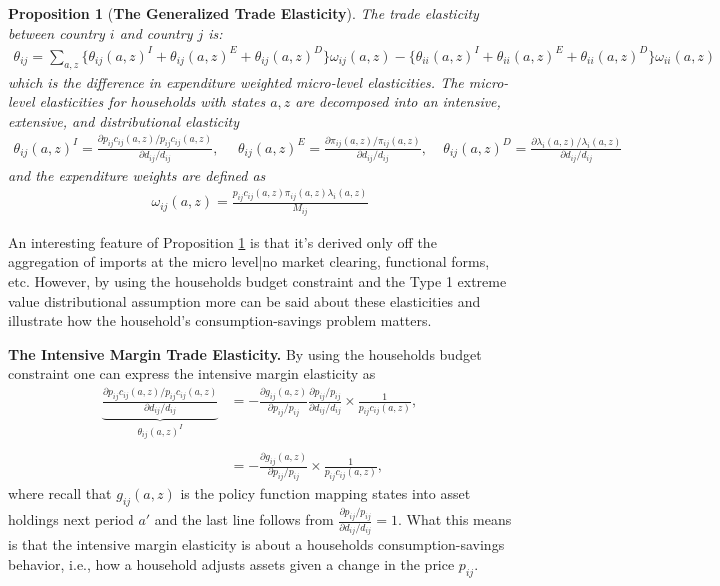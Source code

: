 \documentclass[12pt,pdftex]{article}
\newtheorem{prp}{Proposition}
\begin{document}
\begin{onehalfspacing}
\begin{prp}[\textbf{The Generalized Trade Elasticity}] \label{apx-prp:GET} The trade elasticity between country $i$ and country $j$ is:
{\footnotesize
\begin{align}
\theta_{ij} = \sum_{a,z} \bigg \{ \theta_{ij}(a,z)^{I} + \theta_{ij}(a,z)^{E} + \theta_{ij}(a,z)^{D} \bigg \}\omega_{ij}(a,z) - \bigg \{ \theta_{ii}(a,z)^{I} + \theta_{ii}(a,z)^{E} + \theta_{ii}(a,z)^{D} \bigg \}\omega_{ii}(a,z)
\label{eq:apx-trade-elasticity}
\end{align}
}which is the difference in expenditure weighted micro-level elasticities. The micro-level elasticities for households with states $a,z$ are decomposed into an intensive, extensive, and distributional elasticity
{\footnotesize
\begin{align}
\nonumber
\theta_{ij}(a,z)^{I} = \frac{\partial p_{ij}c_{ij}(a,z)/ p_{ij}c_{ij}(a,z)}{\partial d_{ij} / d_{ij}}, \ \ \ \ \ \ \theta_{ij}(a,z)^{E} = \frac{\partial \pi_{ij}(a,z) / \pi_{ij}(a,z)}{\partial d_{ij} / d_{ij}}, \ \ \ \ \
\theta_{ij}(a,z)^{D} = \frac{\partial \lambda_{i}(a,z) / \lambda_{i}(a,z)}{\partial d_{ij} / d_{ij}}
\end{align}
}
and the expenditure weights are defined as
{\footnotesize
\begin{align}
\nonumber
\omega_{ij}(a,z) = \frac{p_{ij}c_{ij}(a,z)\pi_{ij}(a,z) \lambda_{i}(a,z)}{M_{ij}}
\end{align}
}
\end{prp}
An interesting feature of Proposition \ref{apx-prp:GET} is that it's derived only off the aggregation of imports at the micro level|no market clearing, functional forms, etc. However, by using the households budget constraint and the Type 1 extreme value distributional assumption more can be said about these elasticities and illustrate how the household's consumption-savings problem matters.

\textbf{The Intensive Margin Trade Elasticity.} By using the households budget constraint one can express the intensive margin elasticity as
\begin{align}
\underbrace{\frac{\partial p_{ij}c_{ij}(a,z)/ p_{ij}c_{ij}(a,z)}{\partial d_{ij} / d_{ij}}}_{\theta_{ij}(a,z)^{I}} &= -\frac{\partial g_{ij}(a,z)}{\partial p_{ij}/ p_{ij}} \frac{ \partial p_{ij}/ p_{ij}}{\partial d_{ij}/ d_{ij}} \times \frac{1}{p_{ij}c_{ij}(a,z)}, \\
\nonumber \\
&= -\frac{\partial g_{ij}(a,z)}{\partial p_{ij}/ p_{ij}} \times \frac{1}{p_{ij}c_{ij}(a,z)},
\label{eq:apx-intensive-margin}
\end{align}
where recall that $g_{ij}(a,z)$ is the policy function mapping states into asset holdings next period $a'$ and the last line follows from $\frac{ \partial p_{ij}/ p_{ij}}{\partial d_{ij}/ d_{ij}} = 1$. What this means is that the intensive margin elasticity is about a households consumption-savings behavior, i.e., how a household adjusts assets given a change in the price $p_{ij}$.


\end{onehalfspacing}
\end{document}
